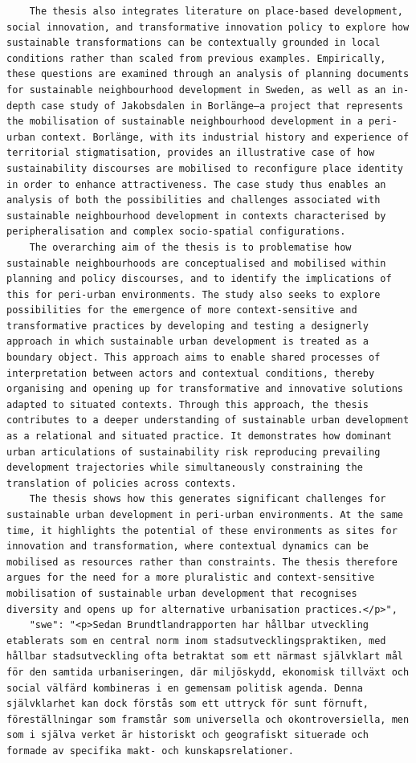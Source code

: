 \begin{casestudySection}
\begin{lstlisting}
    The thesis also integrates literature on place-based development, social innovation, and transformative innovation policy to explore how sustainable transformations can be contextually grounded in local conditions rather than scaled from previous examples. Empirically, these questions are examined through an analysis of planning documents for sustainable neighbourhood development in Sweden, as well as an in-depth case study of Jakobsdalen in Borlänge—a project that represents the mobilisation of sustainable neighbourhood development in a peri-urban context. Borlänge, with its industrial history and experience of territorial stigmatisation, provides an illustrative case of how sustainability discourses are mobilised to reconfigure place identity in order to enhance attractiveness. The case study thus enables an analysis of both the possibilities and challenges associated with sustainable neighbourhood development in contexts characterised by peripheralisation and complex socio-spatial configurations.
    The overarching aim of the thesis is to problematise how sustainable neighbourhoods are conceptualised and mobilised within planning and policy discourses, and to identify the implications of this for peri-urban environments. The study also seeks to explore possibilities for the emergence of more context-sensitive and transformative practices by developing and testing a designerly approach in which sustainable urban development is treated as a boundary object. This approach aims to enable shared processes of interpretation between actors and contextual conditions, thereby organising and opening up for transformative and innovative solutions adapted to situated contexts. Through this approach, the thesis contributes to a deeper understanding of sustainable urban development as a relational and situated practice. It demonstrates how dominant urban articulations of sustainability risk reproducing prevailing development trajectories while simultaneously constraining the translation of policies across contexts.
    The thesis shows how this generates significant challenges for sustainable urban development in peri-urban environments. At the same time, it highlights the potential of these environments as sites for innovation and transformation, where contextual dynamics can be mobilised as resources rather than constraints. The thesis therefore argues for the need for a more pluralistic and context-sensitive mobilisation of sustainable urban development that recognises diversity and opens up for alternative urbanisation practices.</p>",
    "swe": "<p>Sedan Brundtlandrapporten har hållbar utveckling etablerats som en central norm inom stadsutvecklingspraktiken, med hållbar stadsutveckling ofta betraktat som ett närmast självklart mål för den samtida urbaniseringen, där miljöskydd, ekonomisk tillväxt och social välfärd kombineras i en gemensam politisk agenda. Denna självklarhet kan dock förstås som ett uttryck för sunt förnuft, föreställningar som framstår som universella och okontroversiella, men som i själva verket är historiskt och geografiskt situerade och formade av specifika makt- och kunskapsrelationer.

\end{lstlisting}
\end{casestudySection}
